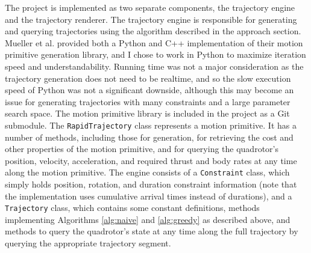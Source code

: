 \documentclass[pageno]{jpaper}
\begin{document}
The project is implemented as two separate components, the trajectory engine and the trajectory renderer. The trajectory engine is responsible for generating and querying trajectories using the algorithm described in the approach section. Mueller et al. provided both a Python and C++ implementation of their motion primitive generation library, and I chose to work in Python to maximize iteration speed and understandability. Running time was not a major consideration as the trajectory generation does not need to be realtime, and so the slow execution speed of Python was not a significant downside, although this may become an issue for generating trajectories with many constraints and a large parameter search space. The motion primitive library is included in the project as a Git submodule. The \texttt{RapidTrajectory} class represents a motion primitive. It has a number of methods, including those for generation, for retrieving the cost and other properties of the motion primitive, and for querying the quadrotor's position, velocity, acceleration, and required thrust and body rates at any time along the motion primitive. The engine consists of a \texttt{Constraint} class, which simply holds position, rotation, and duration constraint information (note that the implementation uses cumulative arrival times instead of durations), and a \texttt{Trajectory} class, which contains some constant definitions, methods implementing Algorithms \ref{alg:naive} and \ref{alg:greedy} as described above, and methods to query the quadrotor's state at any time along the full trajectory by querying the appropriate trajectory segment.
\end{document}
